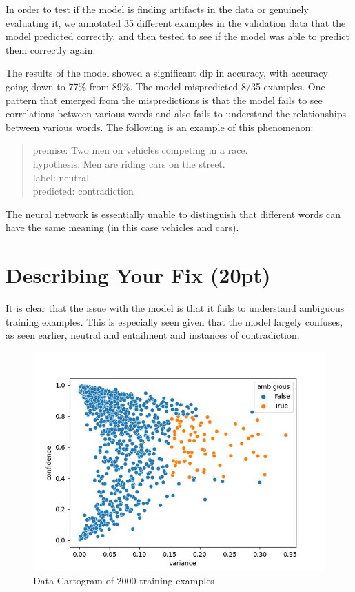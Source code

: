 \documentclass[twocolumn]{article}
\begin{document}
In order to test if the model is finding artifacts in the data or genuinely
evaluating it, we annotated 35 different examples in the validation data that
the model predicted correctly, and then tested to see if the model was able to
predict them correctly again.

The results of the model showed a significant dip in accuracy, with accuracy
going down to 77\% from 89\%. The model mispredicted 8/35 examples. One pattern
that emerged from the mispredictions is that the model fails to see correlations
between various words and also fails to understand the relationships between
various words. The following is an example of this phenomenon: \\

\begin{quote}
premise: Two men on vehicles competing in a race. \\
hypothesis: Men are riding cars on the street. \\
label: neutral \\
predicted: contradiction
\end{quote}

The neural network is essentially unable to distinguish that different words can
have the same meaning (in this case vehicles and cars).

\section{Describing Your Fix (20pt)}

It is clear that the issue with the model is that it fails to understand
ambiguous training examples. This is especially seen given that the model
largely confuses, as seen earlier, neutral and entailment and instances of
contradiction. 


\begin{figure}
  \includegraphics[width=\linewidth]{./ambiguous.jpg}
  \caption{Data Cartogram of 2000 training examples}
  \label{}
\end{figure}
\end{document}
